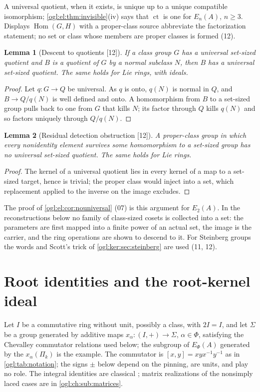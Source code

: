\documentclass[11pt,oneside]{article}
\numberwithin{equation}{section}
\newtheorem{lemma}[lemma]{Lemma}
\theoremstyle{definition}
\theoremstyle{remark}
\newcommand{\ct}{\operatorname{ct}}
\newcommand{\Hom}{\operatorname{Hom}}
\newcommand{\src}[1]{\textup{\textsf{\small[#1]}}}
\begin{document}
A universal quotient, when it exists, is unique up to a unique compatible
isomorphism; \cref{ogl:el:thm:invisible}(iv) says that $\ct$ is one for
$E_n(A)$, $n\ge3$. Displays $\Hom(G,H)$ with a proper-class source abbreviate
the factorization statement; no set or class whose members are proper classes
is formed (12).

\begin{lemma}[Descent to quotients \src{12}]\label{ogl:ch:lem:descent}
If a class group $G$ has a universal set-sized quotient and $B$ is a quotient
of $G$ by a normal subclass $N$, then $B$ has a universal set-sized quotient.
The same holds for Lie rings, with ideals.
\end{lemma}
\begin{proof}
Let $q:G\to Q$ be universal. As $q$ is onto, $q(N)$ is normal in $Q$, and
$B\to Q/q(N)$ is well defined and onto. A homomorphism from $B$ to a set-sized
group pulls back to one from $G$ that kills $N$; its factor through $Q$ kills
$q(N)$ and so factors uniquely through $Q/q(N)$.
\end{proof}

\begin{lemma}[Residual detection obstruction \src{12}]\label{ogl:ch:lem:residual}
A proper-class group in which every nonidentity element survives some
homomorphism to a set-sized group has no universal set-sized quotient. The
same holds for Lie rings.
\end{lemma}
\begin{proof}
The kernel of a universal quotient lies in every kernel of a map to a set-sized
target, hence is trivial; the proper class would inject into a set, which
replacement applied to the inverse on the image excludes.
\end{proof}

The proof of \cref{ogl:el:cor:nouniversal} (07) is this argument for $E_2(A)$.
In the reconstructions below no family of class-sized cosets is collected into
a set: the parameters are first mapped into a finite power of an actual set,
the image is the carrier, and the ring operations are shown to descend to it.
For Steinberg groups the words and Scott's trick of \cref{ogl:ker:sec:steinberg}
are used (11, 12).

\section{Root identities and the root-kernel ideal}\label{ogl:ch:sec:roots}

Let $I$ be a commutative ring without unit, possibly a class, with $2I=I$, and
let $\Sigma$ be a group generated by additive maps $x_\alpha:(I,+)\to\Sigma$,
$\alpha\in\Phi$, satisfying the Chevalley commutator relations used below; the
subgroup of $E_\Phi(A)$ generated by the $x_\alpha(\Pi_k)$ is the example. The
commutator is $[x,y]=xyx^{-1}y^{-1}$ as in \cref{ogl:tab:notation}; the signs
$\pm$ below depend on the pinning, are units, and play no role. The integral
identities are classical \cite{Geck,HVZ}; matrix realizations of the
nonsimply laced cases are in \cref{ogl:ch:sub:matrices}.
\end{document}
